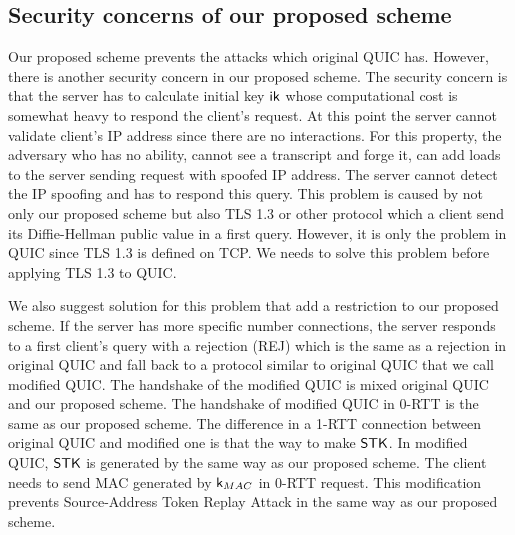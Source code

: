 \subsection{Security concerns of our proposed scheme} \label{sec:prop_sec_concerns}

Our proposed scheme prevents the attacks which original QUIC has.
However, there is another security concern in our proposed scheme.
The security concern is that the server has to calculate initial
key $\mathsf{ik}$ whose computational cost is somewhat heavy to respond the
client's request.
At this point the server cannot validate client's IP address since
there are no interactions.
For this property, the adversary who has no ability, cannot see a
transcript and forge it, can add loads to the server sending request
with spoofed IP address.
The server cannot detect the IP spoofing and has to respond this query.
This problem is caused by not only our proposed scheme but also TLS 1.3
or other protocol which a client send its Diffie-Hellman public value
in a first query.
However, it is only the problem in QUIC since TLS 1.3 is defined on TCP.
We needs to solve this problem before applying TLS 1.3 to QUIC.

We also suggest solution for this problem that add a restriction to our
proposed scheme.
If the server has more specific number connections, the server
responds to a first client's query with a rejection (REJ) which
is the same as a rejection in original QUIC and
fall back to a protocol similar to original QUIC that we call
modified QUIC.
The handshake of the modified QUIC is mixed original QUIC and our
proposed scheme.
The handshake of modified QUIC in 0-RTT is the same as our proposed
scheme.
The difference in a 1-RTT connection between original QUIC and modified one
is that the way to make $\mathsf{STK}$. In modified QUIC, $\mathsf{STK}$ is generated
by the same way as our proposed scheme. The client needs to send
MAC generated by $\mathsf{k}_{MAC}$ in 0-RTT request.
This modification prevents Source-Address Token Replay Attack
in the same way as our proposed scheme.